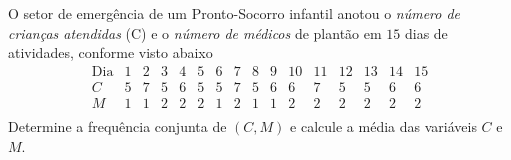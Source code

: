 %
%


\begin{exercicioBanco}[\valorquestao]
    O setor de emergência de um Pronto-Socorro infantil anotou o \textit{número de crianças atendidas} (C) e o \textit{número de médicos} de plantão em \(15\) dias de atividades, conforme visto abaixo
    \[
    \begin{array}{c|ccccccccccccccc}
        \text{Dia} & 1 & 2 & 3 & 4 & 5 & 6 & 7 & 8 & 9 & 10 & 11 & 12 & 13 & 14 & 15 \\
        \hline
        C & 5 & 7 & 5 & 6 & 5 & 5 & 7 & 5 & 6 & 6 & 7 & 5 & 5 & 6 & 6 \\
        \hline
        M & 1 & 1 & 2 & 2 & 2 & 1 & 2 & 1 & 1 & 2 & 2 & 2 & 2 & 2 & 2 \\
    \end{array}
    \]
    Determine a frequência conjunta de \((C,M)\) e calcule a média das variáveis \(C\) e \(M\).
\end{exercicioBanco}

